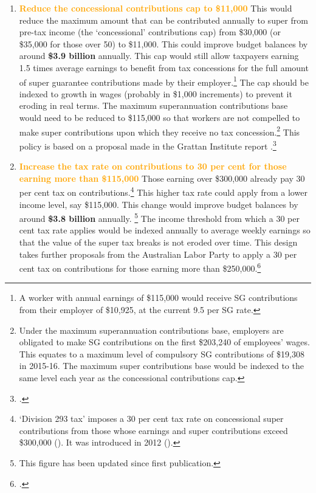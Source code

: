 \DEVIATION{}
\begin{enumerate}
\item 
\textcolor{Orange}{\textbf{Reduce the concessional contributions cap to \$11,000}} \quad
This would reduce the maximum amount that can be contributed annually to super from pre-tax income (the ‘concessional’ contributions cap) from \$30,000 (or \$35,000 for those over 50) to \$11,000. This could improve budget balances by around \textbf{\$3.9 billion} annually. This cap would still allow taxpayers earning 1.5 times average earnings to benefit from tax concessions for the full amount of super guarantee contributions made by their employer.\footnote{A worker with annual earnings of \$115,000 would receive SG contributions from their employer of \$10,925, at the current 9.5 per SG rate.}  The cap should be indexed to growth in wages (probably in \$1,000 increments) to prevent it eroding in real terms. The maximum superannuation contributions base would need to be reduced to \$115,000 so that workers are not compelled to make super contributions upon which they receive no tax concession.\footnote{Under the maximum superannuation contributions base, employers are obligated to make SG contributions on the first \$203,240 of employees’ wages. This equates to a maximum level of compulsory SG contributions of \$19,308 in 2015-16. The maximum super contributions base would be indexed to the same level each year as the concessional contributions cap.}  This policy is based on a proposal made in the Grattan Institute report .\footcite[][32]{DaleyMcGannonSavageEtAl2013BalancingBudgets} 

\item 
\textcolor{Orange}{\textbf{Increase the tax rate on contributions to 30 per cent for those earning more than \$115,000}} \quad
Those earning over \$300,000 already pay 30 per cent tax on contributions.\footnote{‘Division 293 tax’ imposes a 30 per cent tax rate on concessional super contributions from those whose earnings and super contributions exceed \$300,000 (\textcite{ATO2015HowisDiv293calculated}). It was introduced in 2012 (\textcite{Shorten2012}).}  This higher tax rate could apply from a lower income level, say \$115,000. This change would improve budget balances by around \textbf{\$3.8 billion} annually.%
\renewcommand*{\thefootnote}{\fnsymbol{footnote}}%
\footnote[1]{This figure has been updated since first publication.} %
\renewcommand*{\thefootnote}{\arabic{footnote}}%
 The income threshold from which a 30 per cent tax rate applies would be indexed annually to average weekly earnings so that the value of the super tax breaks is not eroded over time. This design takes further proposals from the Australian Labor Party to apply a 30 per cent tax on contributions for those earning more than \$250,000.\footcite{ALP2015FairerSuper}  


\end{enumerate}
